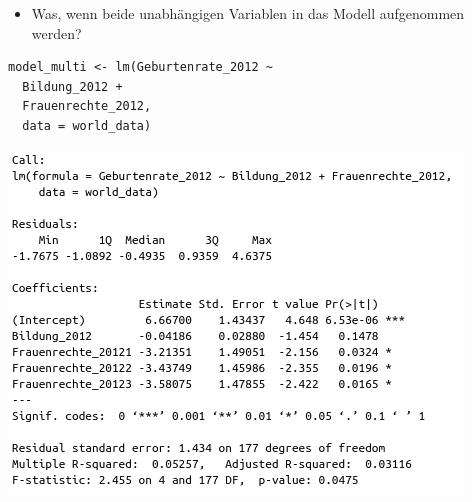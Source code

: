 \documentclass[aspectratio=169, journal, x11names, unknownkeysallowed, hyperref={colorlinks,
linkcolor = SS2,
urlcolor  = F3,
citecolor = F3,
anchorcolor = A4}, 12pt]{beamer}
\begin{document}
  \begin{frame}[t, fragile]
    \begin{minipage}[t]{0.45\textwidth}
        \begin{itemize}
          \item[] Was, wenn beide unabhängigen Variablen in das Modell aufgenommen werden?
        \end{itemize} 
        \begin{lstlisting}
model_multi <- lm(Geburtenrate_2012 ~ 
  Bildung_2012 + 
  Frauenrechte_2012, 
  data = world_data)        
        \end{lstlisting} 

        \centering
        \includegraphics[scale=0.3]{../Plots/sum_multi.png}
      \end{minipage}%
      \begin{minipage}[t]{0.45\textwidth}
        \vspace{-1em}
        \centering

      \end{minipage}
  \end{frame}
\end{document}

